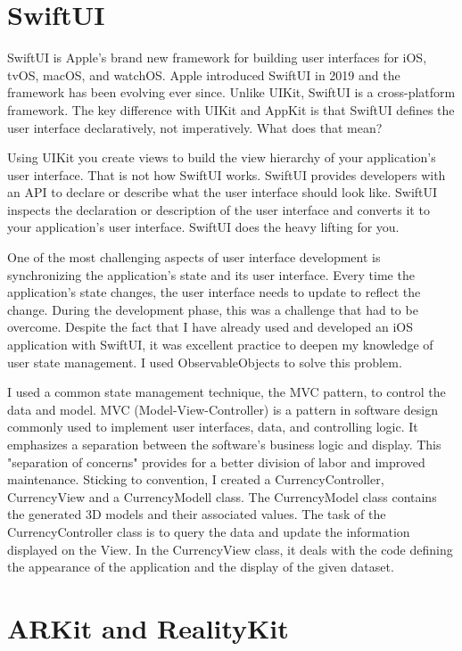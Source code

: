 \section{SwiftUI}

SwiftUI is Apple's brand new framework for building user interfaces for iOS, tvOS, macOS, and watchOS. Apple introduced SwiftUI in 2019 and the framework has been evolving ever since. Unlike UIKit, SwiftUI is a cross-platform framework. The key difference with UIKit and AppKit is that SwiftUI defines the user interface declaratively, not imperatively. What does that mean?

Using UIKit you create views to build the view hierarchy of your application's user interface. That is not how SwiftUI works. SwiftUI provides developers with an API to declare or describe what the user interface should look like. SwiftUI inspects the declaration or description of the user interface and converts it to your application's user interface. SwiftUI does the heavy lifting for you.

One of the most challenging aspects of user interface development is synchronizing the application's state and its user interface. Every time the application's state changes, the user interface needs to update to reflect the change. During the development phase, this was a challenge that had to be overcome. Despite the fact that I have already used and developed an iOS application with SwiftUI, it was excellent practice to deepen my knowledge of user state management. I used ObservableObjects to solve this problem.

I used a common state management technique, the MVC pattern, to control the data and model. MVC (Model-View-Controller) is a pattern in software design commonly used to implement user interfaces, data, and controlling logic. It emphasizes a separation between the software's business logic and display. This "separation of concerns" provides for a better division of labor and improved maintenance. Sticking to convention, I created a CurrencyController, CurrencyView and a CurrencyModell class. The CurrencyModel class contains the generated 3D models and their associated values. The task of the CurrencyController class is to query the data and update the information displayed on the View. In the CurrencyView class, it deals with the code defining the appearance of the application and the display of the given dataset.


\section{ARKit and RealityKit}


